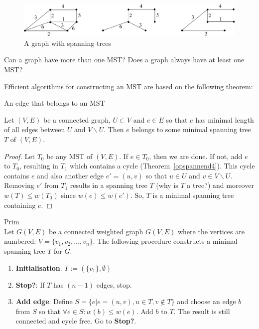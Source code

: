 \begin{figure}[ht]
\begin{center}
\includegraphics[width=0.6\linewidth,keepaspectratio]{opspannend1}
\end{center}
\caption{A graph with spanning trees\label{opspannend1}}
\end{figure}

Can a graph have more than one MST? Does a graph always have at least
one MST?

Efficient algorithms for constructing an MST are based on the following
theorem:

\begin{theorem} An edge that belongs to an MST \label{even}

Let $(V,E)$ be a connected graph, $U \subset V$ and $e \in E$
so that $e$ has minimal length of all edges between $U$ and $V
\backslash U$. Then $e$ belongs to some minimal spanning tree $T$ of
$(V,E)$.
\end{theorem} %
\begin{proof} Let $T_{0}$ be any MST of $(V,E)$. If $e \in T_{0}$,
then we are done. If not, add $e$ to $T_{0}$, resulting in $T_{1}$
which contains a cycle (Theorem~\ref{opspannend4}). This cycle
contains $e$ and also another edge $e' = (u,v)$ so that $u \in U$ and
$v \in V \backslash U$. Removing $e'$ from $T_{1}$ results in a
spanning tree $T$ (why is $T$ a tree?) and moreover $w(T) \leq
w(T_{0})$ since $w(e) \leq w(e')$. So, $T$ is a minimal spanning tree
containing $e$.
\end{proof}


\begin{code}Prim\label{prim} \\
  Let $G(V,E)$ be a connected weighted graph $G(V,E)$ where the
vertices are numbered: $V = \{v_{1},v_{2},\ldots,v_{n}\}$. The
following procedure constructs a minimal spanning tree $T$ for $G$.
\begin{enumerate}
\item \textbf{Initialisation}: $T := (\{v_{1}\},\emptyset)$
\item \textbf{Stop?}: If $T$ has $(n-1)$ edges, stop.
\item \textbf{Add edge}:
Define $S = \{e | e = (u,v), u \in T, v \notin T\}$ and choose an edge
$b$ from $S$ so that $\forall e \in S: w(b) \leq w(e)$. Add $b$ to
$T$. The result is still connected and cycle free.
Go to \textbf{Stop?}.
\end{enumerate}
\end{code}

